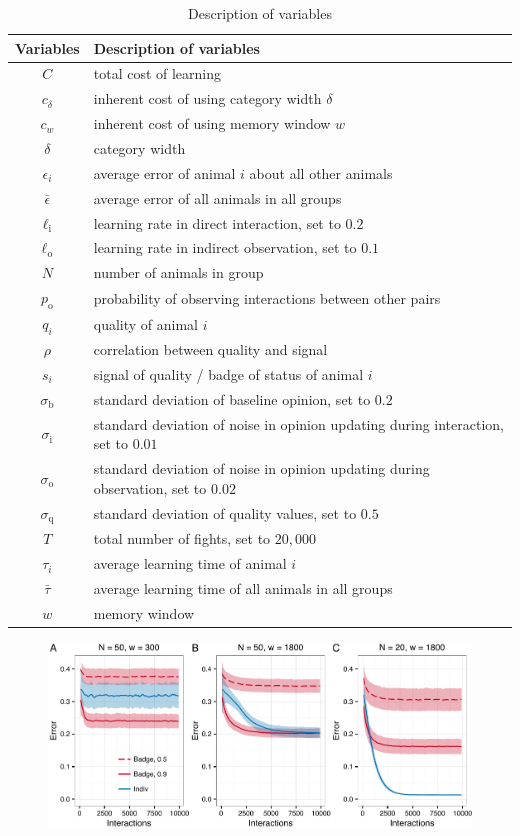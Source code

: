 %
\begin {table}[ht]
\caption {Description of variables} \label{tab:vars} 
\begin{tabular}{cl}

 Variables & Description of variables \\
\midrule 
$C$ & total cost of learning \\ 
$c_\delta$ & inherent cost of using category width $\delta$ \\ 
$c_w$ & inherent cost of using memory window $w$ \\
$\delta$ & category width \\
$\epsilon_i$ & average error of animal $i$ about all other animals \\
$\bar{\epsilon}$ & average error of all animals in all groups \\
$\ell_\text{i}$ & learning rate in direct interaction, set to $0.2$ \\
$\ell_\text{o}$ & learning rate in indirect observation, set to $0.1$ \\
$N$ & number of animals in group \\ 
$p_\text{o}$ & probability of observing interactions between other pairs \\
 $q_i$ & quality of animal $i$ \\ 
 $\rho$ & correlation between quality and signal \\
$s_i$ & signal of quality / badge of status of animal $i$ \\ 
$\sigma_\text{b}$ & standard deviation of baseline opinion, set to $0.2$ \\
$\sigma_\text{i}$ & standard deviation of noise in opinion updating during interaction, set to $0.01$ \\
$\sigma_\text{o}$ & standard deviation of noise in opinion updating during observation, set to $0.02$ \\
$\sigma_\text{q}$ & standard deviation of quality values, set to $0.5$ \\
$T$ & total number of fights, set to $20,000$ \\
$\tau_i$ & average learning time of animal $i$ \\
$\bar{\tau}$ & average learning time of all animals in all groups \\ 
$w$ & memory window 
\end{tabular}
\end {table}

\setcounter{figure}{0}
\begin{figure}
\includegraphics[width=.95\textwidth]{figures/learning_curves.pdf}
\caption{}
\end{figure}


